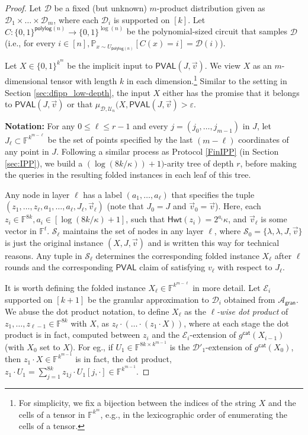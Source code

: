 \documentclass[10pt,a4paper]{article}
\newcommand{\polylog}{\mathsf{polylog}}
\newcommand{\PVAL}{\mathsf{PVAL}}
\newcommand{\Hamming}{\mathsf{Hwt}}
\newcommand{\gran}{\mathsf{gran}}
\newcommand{\F}{\mathbb{F}}
\newcommand{\sU}{\mathcal{U}}
\newcommand{\sD}{\mathcal{D}}
\newcommand{\sA}{\mathcal{A}}
\begin{document}
\begin{proof}
Let $\sD$ be a fixed (but unknown) $m$-product distribution given as $\sD_1 \times \dots \times \sD_m$, where each $\sD_i$ is supported on $[k]$. Let $C : \{0,1\}^{\polylog (n)} \rightarrow \{0,1\}^{\log (n)}$ be the polynomial-sized circuit that samples $\sD$ (i.e., for every $i \in [n], \mathbb{P}_{x \sim U_{\polylog (n)}} \left[ C(x) = i \right] = \sD(i)$).

Let $X \in \{0,1\}^{k^m}$ be the implicit input to $\PVAL(J,\Vec{v})$. We view $X$ as an $m$-dimensional tensor with length $k$ in each dimension.\footnote{For simplicity, we fix a bijection between the indices of the string $X$ and the cells of a tensor in $\F^{k^m}$, e.g., in the lexicographic order of enumerating the cells of a tensor.} Similar to the setting in Section \ref{sec:dfipp_low-depth}, the input $X$ either has the promise that it belongs to $\PVAL(J,\Vec{v})$ or that $\mu_{\sD, \sU_n}(X,\PVAL(J,\Vec{v}) > \varepsilon$. 

\vspace{0.05in}
\textbf{Notation:}  For any $0 \leq \ell \leq r-1$ and every $j = (j_0, \dots, j_{m-1})$ in $J$, let $J_\ell \subset \F^{k^{m-\ell}}$ be the set of points specified by the last $(m-\ell)$ coordinates of any point in $J$. Following a similar process as Protocol \ref{FinIPP} (in Section \ref{sec:IPP}), we build a $(\log (8k/\kappa))+1)$-arity tree of depth $r$, before making the queries in the resulting folded instances in each leaf of this tree. 

Any node in layer $\ell$ has a label $(a_1, \dots, a_\ell)$ that specifies the tuple $(z_1, \dots, z_\ell, a_1, \dots, a_\ell, J_\ell, \Vec{v}_\ell)$ (note that $J_0 = J$ and $\Vec{v}_0 = \Vec{v}$). Here, each $z_i \in \F^{8k}, a_i \in [\log (8k/\kappa)+1]$, such that $\Hamming(z_i) = 2^{a_i}\kappa$, and $\Vec{v}_\ell$ is some vector in $\F^t$. $\mathcal{S}_\ell$ maintains the set of nodes in any layer $\ell$, where $\mathcal{S}_0 = \{\lambda, \lambda, J, \Vec{v}\}$ is just the original instance $(X,J,\Vec{v})$ and is written this way for technical reasons. Any tuple in $\mathcal{S}_\ell$ determines the corresponding folded instance $X_\ell$ after $\ell$ rounds and the corresponding $\PVAL$ claim of satisfying $v_\ell$ with respect to $J_{\ell}$.

It is worth defining the folded instance $X_\ell \in \F^{k^{m-\ell}}$ in more detail. Let $\mathcal{E}_i$ supported on $[k+1]$ be the granular approximation to $\sD_i$ obtained from $\sA_\gran$. We abuse the dot product notation, to define $X_\ell$ as the \textit{$\ell$-wise dot product} of $z_1, \dots, z_{\ell-1} \in \F^{8k}$ with $X$, as $z_\ell \cdot (\dots \cdot (z_1 \cdot X))$, where at each stage the dot product is in fact, computed between $z_i$ and the $\mathcal{E}_{i}$-extension of $g^{\mathsf{cat}} (X_{i-1})$ (with $X_0$ set to $X$). For eg., if $U_1 \in \F^{8k \times k^{m-1}}$ is the $\sD'_1$-extension of $g^{\mathsf{cat}}(X_0)$, then $z_1 \cdot X \in \F^{k^{m-1}}$ is in fact, the dot product, $z_1 \cdot U_1 = \sum_{j=1}^{8k} z_{1j} \cdot U_1[j,\cdot] \in \F^{k^{m-1}}$.


\end{proof}
\end{document}
